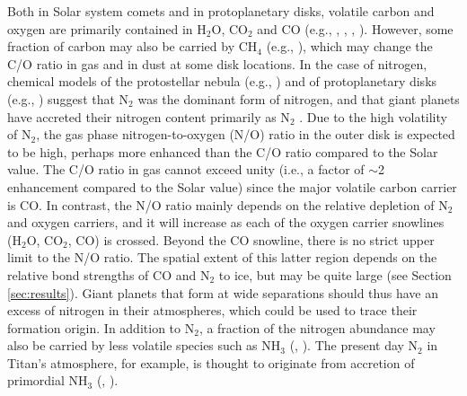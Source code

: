 \documentclass[apj]{emulateapj}
\begin{document}
Both in Solar system comets and in protoplanetary disks, volatile carbon and oxygen are primarily contained in H$_2$O, CO$_2$ and CO (e.g., \citealt{lodders03}, \citealt{mumma11}, \citealt{oberg11}, \citealt{boogert15}). However, some fraction of carbon may also be carried by CH$_4$ (e.g., \citealt{oberg08}), which may change the C/O ratio in gas and in dust at some disk locations. In the case of nitrogen, chemical models of the protostellar nebula (e.g., \citealt{owen01}) and of protoplanetary disks (e.g., \citealt{rodgers02}) suggest that N$_2$ was the dominant form of nitrogen, and that giant planets have accreted their nitrogen content primarily as N$_2$ \citep{mousis14}. %
Due to the high volatility of N$_2$, the gas phase nitrogen-to-oxygen (N/O) ratio in the outer disk is expected to be high, perhaps more enhanced than the C/O ratio compared to the Solar value. %
The C/O ratio in gas cannot exceed unity (i.e., a factor of $\sim$2 enhancement compared to the Solar value) since the major volatile carbon carrier is CO. In contrast, the N/O ratio mainly depends on the relative depletion of N$_2$ and oxygen carriers, and it will increase as each of the oxygen carrier snowlines (H$_2$O, CO$_2$, CO) is crossed. Beyond the CO snowline, there is no strict upper limit to the N/O ratio. The spatial extent of this latter region depends on the relative bond strengths of CO and N$_2$ to ice, but may be quite large (see Section \ref{sec:results}). Giant planets that form at wide separations should thus have an excess of nitrogen in their atmospheres, which could be used to trace their formation origin. In addition to N$_2$, a fraction of the nitrogen abundance may also be carried by less volatile species such as NH$_3$ (\citealt{bottinelli10}, \citealt{mumma11}). The present day N$_2$ in Titan's atmosphere, for example, is thought to originate from accretion of primordial NH$_3$ (\citealt{atreya78}, \citealt{mandt14}). 
\end{document}

